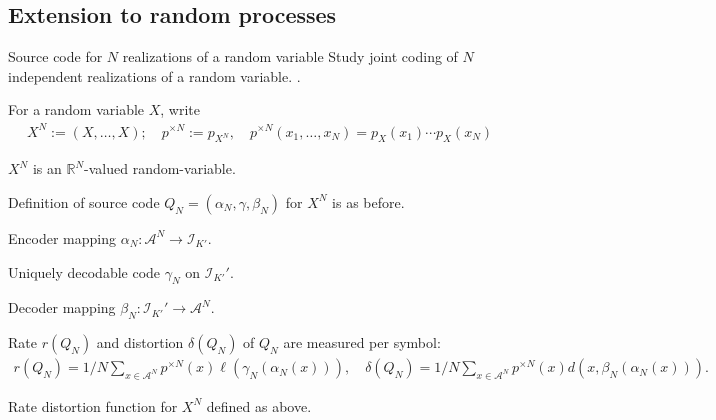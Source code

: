 %
\subsection{Extension to random processes}
\begin{frame}{Source code for $N$ realizations of a random variable} 
 Study joint coding of $N$ independent realizations of a random variable. .
\bit
\item For a random variable $X$, write 
\begin{align*}
X^N:=(X,\dots,X); \quad p^{\times N}:=p_{X^N},\quad  p^{\times N}(x_1,\dots,x_N)=p_X(x_1)\cdots p_X(x_N)
\end{align*}
\item $X^N$ is an $\mathbb{R}^N$-valued random-variable.  
\item Definition of source code $Q_N=(\alpha_N,\gamma,\beta_N)$  for $X^N$ is as before.
\bit
\item Encoder mapping $\alpha_N:\mathcal{A}^N\to \mathcal{I}_{K'}$.
\item Uniquely decodable code $\gamma_N$ on $\mathcal{I}_{K'}'$.
\item Decoder mapping $\beta_N:\mathcal{I}_{K'}'\to\mathcal{A}^N$. 
\eit
\item Rate $r(Q_N)$  and distortion $\delta(Q_N)$ of $Q_N$ are measured per symbol: 
\begin{align*}
r(Q_N)=1/N\sum_{x\in\mathcal{A}^N}p^{\times N}(x)\ell(\gamma_N(\alpha_N(x))), \quad \delta(Q_N)= 1/N\sum_{x\in\mathcal{A}^N}p^{\times N}(x)d(x,\beta_N(\alpha_N(x))).
\end{align*} 
\item[\iarrow] Rate distortion function for $X^N$ defined as above. 
\eit
\end{frame}


